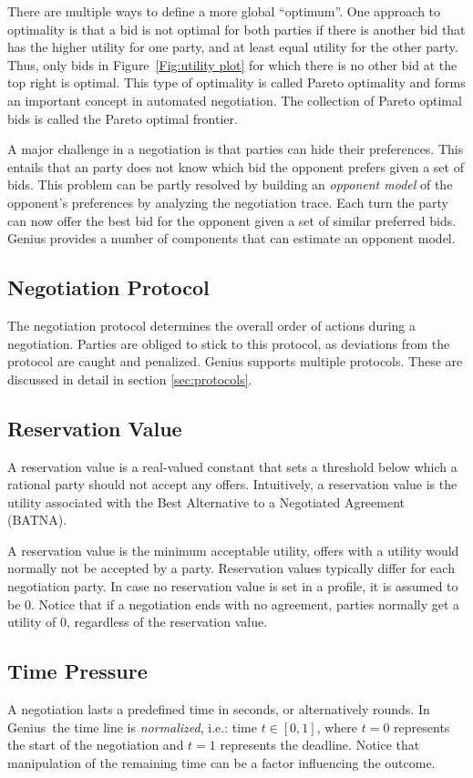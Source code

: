 \documentclass[]{article}
\newcommand\Genius{{\sc Genius}}
\begin{document}
There are multiple ways to define a more global ``optimum''. One approach to optimality is that a bid is not optimal for both parties if there is another bid that has the higher utility for one party, and at least equal utility for the other party. Thus, only bids in Figure~\ref{Fig:utility plot} for which there is no other bid at the top right is optimal. This type of optimality is called Pareto optimality and forms an important concept in automated negotiation. The collection of Pareto optimal bids is called the Pareto optimal frontier.

A major challenge in a negotiation is that parties can hide their preferences. This entails that an party does not know which bid the opponent prefers given a set of bids. This problem can be partly resolved by building an \textit{opponent model} of the opponent's preferences by analyzing the negotiation trace. Each turn the party can now offer the best bid for the opponent given a set of similar preferred bids. {\Genius}  provides a number of components that can estimate an opponent model.

\subsection{Negotiation Protocol}
The negotiation protocol determines the overall order of actions during a negotiation. Parties are obliged to stick to this protocol, as deviations from the protocol are caught and penalized. {\Genius} supports multiple protocols. These are discussed in detail in section \ref{sec:protocols}.

 
\subsection{Reservation Value}
A reservation value is a real-valued constant that sets a threshold below which a rational party should not accept any offers. Intuitively, a reservation value is the utility associated with the Best Alternative to a Negotiated Agreement (BATNA).

A reservation value is the minimum acceptable utility, offers with a utility would normally not be accepted by a party. Reservation values typically differ for each negotiation party. In case no reservation value is set in a profile, it is assumed to be 0. Notice that if a negotiation ends with no agreement, parties normally get a utility of 0, regardless of the reservation value.

\subsection{Time Pressure}
A negotiation lasts a predefined time in seconds, or alternatively rounds. In {\Genius}~the time line is \emph{normalized}, i.e.: time $t \in [0, 1]$, where $t = 0$ represents the start of the negotiation and $t = 1$ represents the deadline. Notice that manipulation of the remaining time can be a factor influencing the outcome.
\end{document}
